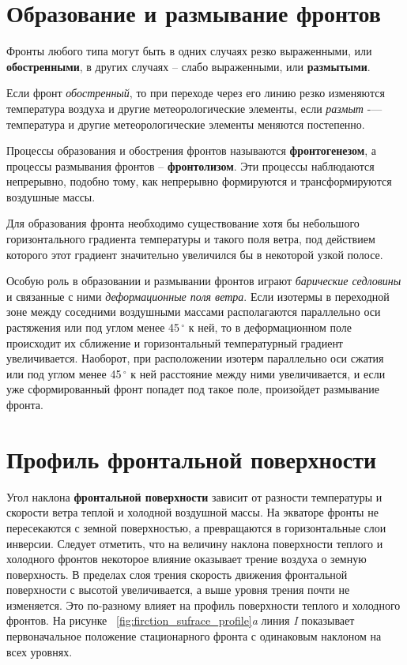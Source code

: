 \documentclass[a4paper, 12pt, twoside, final, book, russian, fittopage, cyremdash, openright]{ncc}
\newcommand{\gr}{\ensuremath{\,^\circ}\xspace}
\begin{document}
\section{Образование и размывание фронтов}
\label{sec:makes_fronts}

Фронты любого типа могут быть в одних случаях резко выраженными, или
\textbf{обостренными}, в других случаях \--- слабо
выраженными, или \textbf{размытыми}.

Если фронт \textit{обостренный}, то при переходе через его линию резко
изменяются температура воздуха и другие метеорологические элементы,
если \textit{размыт} \--— температура и другие метеорологические
элементы меняются постепенно.

Процессы образования и обострения фронтов называются
\textbf{фронтогенезом}, а процессы размывания
фронтов \--- \textbf{фронтолизом}. Эти процессы
наблюдаются непрерывно, подобно тому, как непрерывно формируются и
трансформируются воздушные массы.

Для образования фронта необходимо существование хотя бы небольшого
горизонтального градиента температуры и такого поля ветра, под
действием которого этот градиент значительно увеличился бы в некоторой
узкой полосе.

Особую роль в образовании и размывании фронтов играют \textit{барические
седловины} и связанные с ними \textit{деформационные поля ветра}. Если изотермы
в переходной зоне между соседними воздушными массами располагаются
параллельно оси растяжения или под углом менее 45\gr{} к ней, то в
деформационном поле происходит их сближение и горизонтальный
температурный градиент увеличивается. Наоборот, при расположении
изотерм параллельно оси сжатия или под углом менее 45\gr{} к ней
расстояние между ними увеличивается, и если уже сформированный фронт
попадет под такое поле, произойдет размывание фронта.

\section{Профиль фронтальной поверхности}
\label{sec:frontal_surface_profile}

Угол наклона \textbf{фронтальной поверхности} зависит от разности
температуры и скорости ветра теплой и холодной воздушной массы. На
экваторе фронты не пересекаются с земной поверхностью, а превращаются
в горизонтальные слои инверсии. Следует отметить, что на величину
наклона поверхности теплого и холодного фронтов некоторое влияние
оказывает трение воздуха о земную поверхность. В пределах слоя трения
скорость движения фронтальной поверхности с высотой увеличивается, а
выше уровня трения почти не изменяется. Это по-разному влияет на
профиль поверхности теплого и холодного фронтов. На рисунке
~\ref{fig:firction_sufrace_profile}\textit{a} линия \textit{I}
показывает первоначальное положение стационарного фронта с одинаковым
наклоном на всех уровнях.
\end{document}
